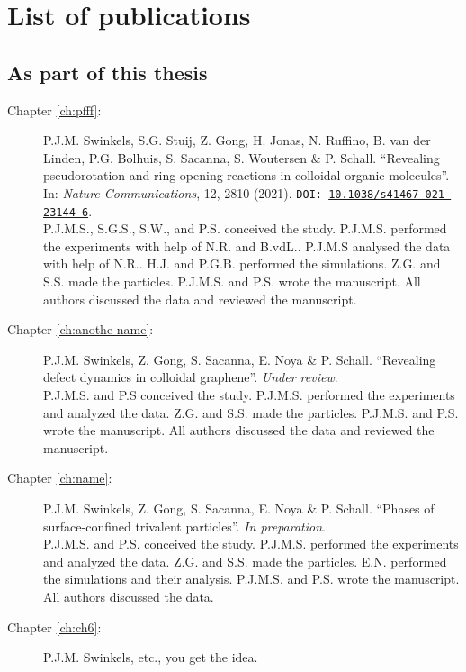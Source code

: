 
\chapter{List of publications}

\section*{As part of this thesis}

\pgfmathsetmacro\chapclrthree{\colourarray[3]}
\pgfmathsetmacro\chapclrfour{\colourarray[4]}
\pgfmathsetmacro\chapclrfive{\colourarray[5]}
\pgfmathsetmacro\chapclrsix{\colourarray[6]}

{ \small
\begin{description}
	\item[\textcolor{\chapclrthree}{Chapter \ref{ch:pfff}}:] P.J.M. Swinkels, S.G. Stuij, Z. Gong, H. Jonas, N. Ruffino, B. van der Linden, P.G. Bolhuis, S. Sacanna, S. Woutersen \& P. Schall. ``Revealing pseudorotation and ring-opening reactions in colloidal organic molecules''. In: \textit{Nature Communications}, 12, 2810 (2021). \texttt{DOI: \href{https://doi.org/10.1038/s41467-021-23144-6}{10.1038/s41467-021-23144-6}\allowbreak}.\\
	P.J.M.S., S.G.S., S.W., and P.S. conceived the study. P.J.M.S. performed the experiments with help of N.R. and B.vdL.. P.J.M.S analysed the data with help of N.R.. H.J. and P.G.B. performed the simulations. Z.G. and S.S. made the particles. P.J.M.S. and P.S. wrote the manuscript. All authors discussed the data and reviewed the manuscript. 
	\item [\textcolor{\chapclrfour}{Chapter \ref{ch:anothe-name}}:] P.J.M. Swinkels, Z. Gong, S. Sacanna, E. Noya \& P. Schall. ``Revealing defect dynamics in colloidal graphene''. \textit{Under review}.\\
	P.J.M.S. and P.S conceived the study. P.J.M.S. performed the experiments and analyzed the data. Z.G. and S.S. made the particles. P.J.M.S. and P.S. wrote the manuscript. All authors discussed the data and reviewed the manuscript.
	\item [\textcolor{\chapclrfive}{Chapter \ref{ch:name}}:] P.J.M. Swinkels, Z. Gong, S. Sacanna, E. Noya \& P. Schall. ``Pha\-ses of sur\-fa\-ce\--con\-fi\-ned
	trivalent particles''. \textit{In preparation}.\\
	P.J.M.S. and P.S. conceived the study. P.J.M.S. performed the experiments and analyzed the data. Z.G. and S.S. made the particles. E.N. performed the simulations and their analysis. P.J.M.S. and P.S. wrote the manuscript. All authors discussed the data.
	\item [\textcolor{\chapclrsix}{Chapter \ref{ch:ch6}}:]  P.J.M. Swinkels, etc., you get the idea.
\end{description}
}

